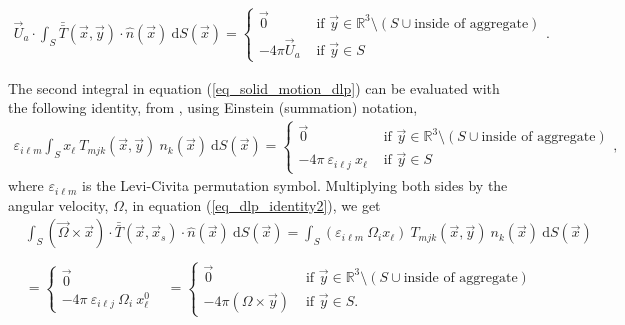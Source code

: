 \begin{align}
	\vec{U}_a \cdot
	\int_S  \bar{\bar{T}}(\vec{x},\vec{y}) \cdot \hat{n} ( \vec{x})
	\ \text{d}S(\vec{x})
	=
	 \begin{cases}
	 \vec{0}& \text{ if } \vec{y} \in \mathbb{R}^3  \setminus \left( S \cup {\text{inside of aggregate}}\right) 	\\ 
	 - 4\pi \vec{U}_a  & \text{ if } \vec{y} \in S 
	 \end{cases}.
	\label{eq_dlp_Ua}
\end{align}
\par 
The second integral in equation (\ref{eq_solid_motion_dlp}) can be evaluated with the following identity, from \cite{pozrikidis_boundary_1992},
using Einstein (summation) notation, 
\begin{align}
	\varepsilon_{i \ell m}
	\int_S x_{\ell} \ T_{mjk}(\vec{x},\vec{y})  \ n_{k} ( \vec{x})
	\ \text{d}S(\vec{x})
	 = 
	 \begin{cases}
	  \vec{0}
	  & \text{ if } \vec{y} \in \mathbb{R}^3  \setminus  	\left( S \cup {\text{inside of aggregate}}\right) \\ 
	 - 4\pi \ \varepsilon_{i \ell j} \ x_{\ell}
	 & \text{ if } \vec{y} \in S 
	 \end{cases},
	\label{eq_dlp_identity2}
\end{align}
where $\varepsilon_{i \ell m}$ is the Levi-Civita permutation symbol.  
Multiplying both sides by the angular velocity, $\Omega$, in equation (\ref{eq_dlp_identity2}), we get 
\begin{align}
	&
	\int_S
	\left( \vec{\Omega} \times \vec{x} \right)
	 \cdot  \bar{\bar{T}}(\vec{x},\vec{x}_s)  
	\cdot \hat{n} ( \vec{x})
	\ \text{d}S(\vec{x})
	 = 
	\int_S 
	\left(  \varepsilon_{i \ell m} \ \Omega_{i} x_{\ell} \right) \ 	T_{mjk}(\vec{x},\vec{y})  \ n_{k} ( \vec{x})
	\ \text{d}S(\vec{x})
	\nonumber \\
	\nonumber \\
 	& = 
 	\begin{cases}
 	  \vec{0}
 	 &  \\ 
 	- 4\pi \ \varepsilon_{i \ell j}\  \Omega_{i} \ x^0_{\ell}
 	& 
 	\end{cases}
	= \begin{cases}
 	  \vec{0}
 	 & \text{ if } \vec{y} \in \mathbb{R}^3  \setminus  
	 \left( S \cup {\text{inside of aggregate}}\right)
	  \\ 
 	- 4\pi \left(  \Omega \times \vec{y} \right)
 	& \text{ if } \vec{y} \in S.
 	\end{cases}
	\label{eq_dlp_Omega}
\end{align}
